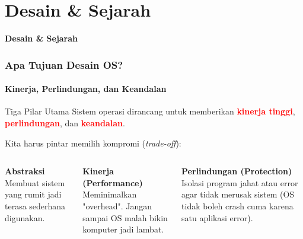 \documentclass[t,aspectratio=169,xcolor=dvipsnames]{beamer}
\newcommand{\tem}[1]{\textbf{\textcolor{red}{#1}}}
\begin{document}
\section{Desain \& Sejarah}

\begin{frame}[plain]
    \begin{center}
        \vspace{3cm}
        \Huge\textbf{Desain \& Sejarah}
    \end{center}
\end{frame}

\begin{frame}[t]
    \frametitle{Apa Tujuan Desain OS?}
    \framesubtitle{Kinerja, Perlindungan, dan Keandalan}
    
    \begin{block}{Tiga Pilar Utama}
        Sistem operasi dirancang untuk memberikan \tem{kinerja tinggi}, \tem{perlindungan}, dan \tem{keandalan}.
    \end{block}
    \vspace{0.3cm}
    
    \small
    Kita harus pintar memilih kompromi (\textit{trade-off}):
    
    \begin{columns}[t]
            \textbf{Abstraksi} \\
            Membuat sistem yang rumit jadi terasa sederhana digunakan.
            
            \vspace{0.2cm}
            \textbf{Kinerja (Performance)} \\
            Meminimalkan "overhead". Jangan sampai OS malah bikin komputer jadi lambat.
            
            \textbf{Perlindungan (Protection)} \\
            Isolasi program jahat atau error agar tidak merusak sistem (OS tidak boleh crash cuma karena satu aplikasi error).
    \end{columns}
\end{frame}

\end{document}
